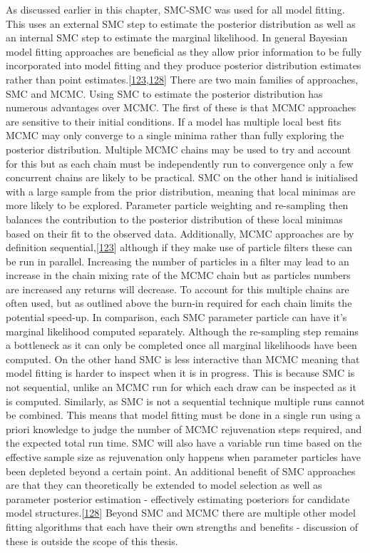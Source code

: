 \documentclass[11pt,twoside]{bristolthesis}
\begin{document}
  As discussed earlier in this chapter, SMC-SMC was used for all model fitting. This uses an external SMC step to estimate the posterior distribution as well as an internal SMC step to estimate the marginal likelihood. In general Bayesian model fitting approaches are beneficial as they allow prior information to be fully incorporated into model fitting and they produce posterior distribution estimates rather than point estimates.{[}\protect\hyperlink{ref-Murray2015}{123},\protect\hyperlink{ref-Toni2009}{128}{]} There are two main families of approaches, SMC and MCMC. Using SMC to estimate the posterior distribution has numerous advantages over MCMC. The first of these is that MCMC approaches are sensitive to their initial conditions. If a model has multiple local best fits MCMC may only converge to a single minima rather than fully exploring the posterior distribution. Multiple MCMC chains may be used to try and account for this but as each chain must be independently run to convergence only a few concurrent chains are likely to be practical. SMC on the other hand is initialised with a large sample from the prior distribution, meaning that local minimas are more likely to be explored. Parameter particle weighting and re-sampling then balances the contribution to the posterior distribution of these local minimas based on their fit to the observed data. Additionally, MCMC approaches are by definition sequential,{[}\protect\hyperlink{ref-Murray2015}{123}{]} although if they make use of particle filters these can be run in parallel. Increasing the number of particles in a filter may lead to an increase in the chain mixing rate of the MCMC chain but as particles numbers are increased any returns will decrease. To account for this multiple chains are often used, but as outlined above the burn-in required for each chain limits the potential speed-up. In comparison, each SMC parameter particle can have it's marginal likelihood computed separately. Although the re-sampling step remains a bottleneck as it can only be completed once all marginal likelihoods have been computed. On the other hand SMC is less interactive than MCMC meaning that model fitting is harder to inspect when it is in progress. This is because SMC is not sequential, unlike an MCMC run for which each draw can be inspected as it is computed. Similarly, as SMC is not a sequential technique multiple runs cannot be combined. This means that model fitting must be done in a single run using a priori knowledge to judge the number of MCMC rejuvenation steps required, and the expected total run time. SMC will also have a variable run time based on the effective sample size as rejuvenation only happens when parameter particles have been depleted beyond a certain point. An additional benefit of SMC approaches are that they can theoretically be extended to model selection as well as parameter posterior estimation - effectively estimating posteriors for candidate model structures.{[}\protect\hyperlink{ref-Toni2009}{128}{]} Beyond SMC and MCMC there are multiple other model fitting algorithms that each have their own strengths and benefits - discussion of these is outside the scope of this thesis.
  
\end{document}
